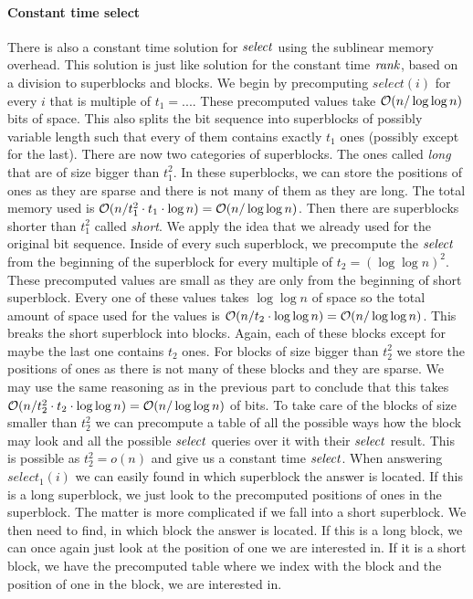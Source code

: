 \paragraph{Constant time select}

There is also a constant time solution for $\mathit{select}$ using the sublinear memory overhead.
This solution is just like solution for the constant time $\mathit{rank}$, based on a division
to superblocks and blocks. We begin by precomputing $select(i)$ for every $i$ that is
multiple of $t_1=...$. These precomputed values take $\mathcal{O}(n/\log\log n)$ bits of space.
This also splits the bit sequence into superblocks of possibly variable length such that
every of them contains exactly $t_1$ ones (possibly except for the last). There are
now two categories of superblocks. The ones called \textit{long} that are of size bigger
than $t_1^2$. In these superblocks, we can store the positions of ones as they are sparse
and there is not many of them as they are long. The total memory used is $\mathcal{O}(n/t_1^2\cdot t_1\cdot
\log n) = \mathcal{O}(n/\log\log n)$. Then there are superblocks shorter than $t_1^2$ called
\textit{short}. We apply the idea that we already used for the original bit sequence. Inside of
every such superblock, we precompute the $\mathit{select}$ from the beginning of the superblock for every
multiple of $t_2=(\log\log n)^2$. These precomputed values are small as they are only from the
beginning of short superblock. Every one of these values takes $\log\log n$ of space so the
total amount of space used for the values is $\mathcal{O}(n/t_2\cdot \log\log n) = \mathcal{O}(n/\log\log n)$.
This breaks the short superblock into blocks. Again, each of these blocks except for maybe the
last one contains $t_2$ ones. For blocks of size bigger than $t_2^2$ we store the positions of
ones as there is not many of these blocks and they are sparse. We may use the same reasoning as
in the previous part to conclude that this takes $\mathcal{O}(n/t_2^2\cdot t_2\cdot \log\log n) = \mathcal{O}(n/\log\log n)$
of bits. To take care of the blocks of size smaller than $t_2^2$ we can precompute a table of all
the possible ways how the block may look and all the possible $\mathit{select}$ queries over it with
their $\mathit{select}$ result. This is possible as $t_2^2 = o(n)$ and give us a constant time $\mathit{select}$.
When answering $select_1(i)$ we can easily found in which superblock the answer is located. If this
is a long superblock, we just look to the precomputed positions of ones in the superblock. The matter
is more complicated if we fall into a short superblock. We then need to find, in which block the answer
is located. If this is a long block, we can once again just look at the position of one we are interested
in. If it is a short block, we have the precomputed table where we index with the block and the position of
one in the block, we are interested in.

